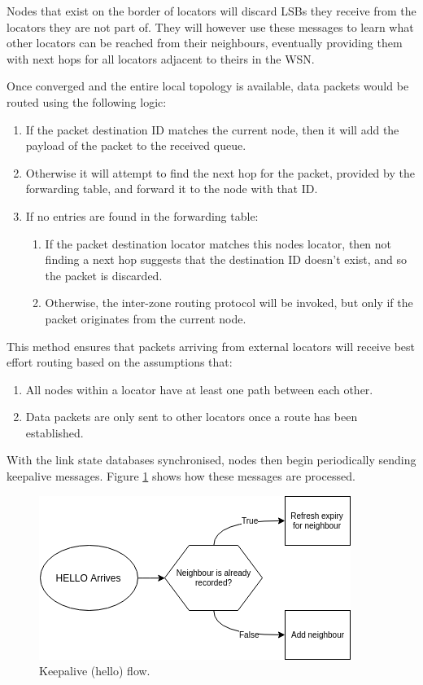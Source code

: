 \documentclass[12pt]{article}
\begin{document}
Nodes that exist on the border of locators will discard LSBs they receive from the locators they are not part of. They will however use these messages to learn what other locators can be reached from their neighbours, eventually providing them with next hops for all locators adjacent to theirs in the WSN.

Once converged and the entire local topology is available, data packets would be routed using the following logic:

\begin{enumerate}
	\item If the packet destination ID matches the current node, then it will add the payload of the packet to the received queue. 
	\item Otherwise it will attempt to find the next hop for the packet, provided by the forwarding table, and forward it to the node with that ID. 
	\item If no entries are found in the forwarding table:
	\begin{enumerate}
		\item If the packet destination locator matches this nodes locator, then not finding a next hop suggests that the destination ID doesn't exist, and so the packet is discarded. 
		\item Otherwise, the inter-zone routing protocol will be invoked, but only if the packet originates from the current node. 
	\end{enumerate}
\end{enumerate}

This method ensures that packets arriving from external locators will receive best effort routing based on the assumptions that:

\begin{enumerate}
	\item All nodes within a locator have at least one path between each other. 
	\item Data packets are only sent to other locators once a route has been established.
\end{enumerate}

With the link state databases synchronised, nodes then begin periodically sending keepalive messages. Figure \ref{fig:helloflow} shows how these messages are processed. 

\begin{figure}[!ht]
	\centering
	\includegraphics[width=0.6\linewidth]{images/helloflow}
	\caption{Keepalive (hello) flow.}
	\label{fig:helloflow}
\end{figure}
\end{document}

